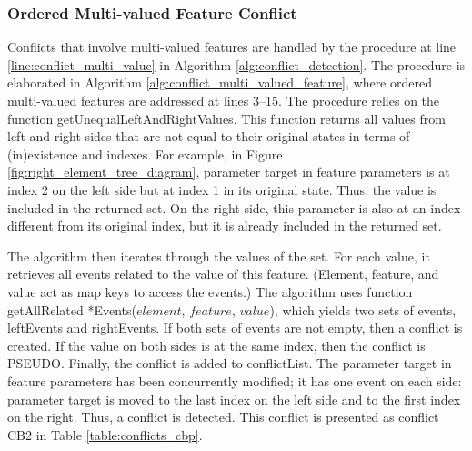\subsubsection{Ordered Multi-valued Feature Conflict}
\label{sec:ordered_conflict}
Conflicts that involve multi-valued features are handled by the procedure at line \ref{line:conflict_multi_value} in Algorithm \ref{alg:conflict_detection}. The procedure is elaborated in Algorithm \ref{alg:conflict_multi_valued_feature}, where ordered multi-valued features are addressed at lines 3–15. The procedure relies on the function \textsf{getUnequalLeftAndRightValues}. This function returns all values from left and right sides that are not equal to their original states in terms of (in)existence and indexes. For example, in Figure \ref{fig:right_element_tree_diagram}, parameter \textsf{target} in feature \textsf{parameters} is at index 2 on the left side but at index 1 in its original state. Thus, the value is included in the returned set. On the right side, this parameter is also at an index different from its original index, but it is already included in the returned set.

The algorithm then iterates through the values of the set. For each value, it retrieves all events related to the value of this feature. (Element, feature, and value act as map keys to access the events.) The algorithm uses function \textsf{getAllRelated *Events($element$, $feature$, $value$)}, which yields two sets of events, \textsf{leftEvents} and \textsf{rightEvents}. If both sets of events are not empty, then a conflict is created. If the value on both sides is at the same index, then the conflict is \textsf{PSEUDO}. Finally, the conflict is added to \textsf{conflictList}. The parameter \textsf{target} in feature \textsf{parameters} has been concurrently modified; it has one event on each side: parameter \textsf{target} is moved to the last index on the left side and to the first index on the right. Thus, a conflict is detected. This conflict is presented as conflict \textsf{CB2} in Table \ref{table:conflicts_cbp}.


